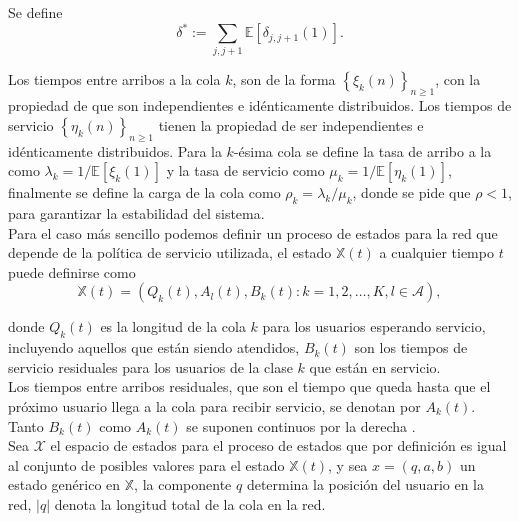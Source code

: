 \documentclass{article}
\newcommand{\esp}{\mathbb{E}}
\numberwithin{equation}{section}
\begin{document}
Se define
\begin{equation}
\delta^{*}:=\sum_{j,j+1}\esp\left[\delta_{j,j+1}\left(1\right)\right].
\end{equation}

Los tiempos entre arribos a la cola $k$, son de la forma $\left\{\xi_{k}\left(n\right)\right\}_{n\geq1}$, con la propiedad de que son independientes e id\'enticamente distribuidos. Los tiempos de servicio $\left\{\eta_{k}\left(n\right)\right\}_{n\geq1}$ tienen la propiedad de ser independientes e id\'enticamente distribuidos. Para la $k$-\'esima cola se define la tasa de arribo a la como $\lambda_{k}=1/\esp\left[\xi_{k}\left(1\right)\right]$ y la tasa de servicio como $\mu_{k}=1/\esp\left[\eta_{k}\left(1\right)\right]$, finalmente se define la carga de la cola como $\rho_{k}=\lambda_{k}/\mu_{k}$, donde se pide que $\rho<1$, para garantizar la estabilidad del sistema.\\

Para el caso m\'as sencillo podemos definir un proceso de estados para la red que depende de la pol\'itica de servicio utilizada, el estado $\mathbb{X}\left(t\right)$ a cualquier tiempo $t$ puede definirse como
\begin{equation}\label{Eq.Esp.Estados}
\mathbb{X}\left(t\right)=\left(Q_{k}\left(t\right),A_{l}\left(t\right),B_{k}\left(t\right):k=1,2,\ldots,K,l\in\mathcal{A}\right),
\end{equation}

donde $Q_{k}\left(t\right)$ es la longitud de la cola $k$ para los usuarios esperando servicio, incluyendo aquellos que est\'an siendo atendidos, $B_{k}\left(t\right)$ son los tiempos de servicio residuales para los usuarios de la clase $k$ que est\'an en servicio.\\

Los tiempos entre arribos residuales, que son el tiempo que queda hasta que el pr\'oximo usuario llega a la cola para recibir servicio, se denotan por $A_{k}\left(t\right)$. Tanto $B_{k}\left(t\right)$ como $A_{k}\left(t\right)$ se suponen continuos por la derecha \cite{Dai2}.\\

Sea $\mathcal{X}$ el espacio de estados para el proceso de estados que por definici\'on es igual  al conjunto de posibles valores para el estado $\mathbb{X}\left(t\right)$, y sea $x=\left(q,a,b\right)$ un estado gen\'erico en $\mathbb{X}$, la componente $q$ determina la posici\'on del usuario en la red, $|q|$ denota la longitud total de la cola en la red.\\
\end{document}
